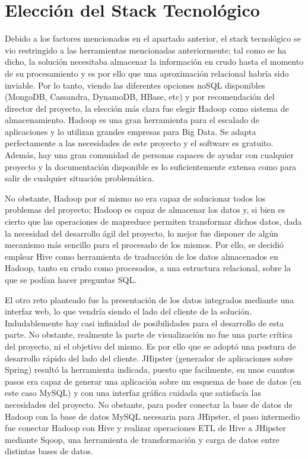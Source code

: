 \section{Elección del Stack Tecnológico}  \label{analisis.stack}
Debido a los factores mencionados en el apartado anterior, el stack tecnológico se vio restringido a las herramientas mencionadas anteriormente; tal como se ha dicho, la solución necesitaba almacenar la información en crudo hasta el momento de su procesamiento y es por ello que una aproximación relacional habría sido inviable. Por lo tanto, viendo las diferentes opciones noSQL disponibles (MongoDB, Cassandra, DynamoDB, HBase, etc) y por recomendación del director del proyecto, la elección más clara fue elegir Hadoop como sistema de almacenamiento. Hadoop es una gran herramienta para el escalado de aplicaciones y lo utilizan grandes empresas para Big Data. Se adapta perfectamente a las necesidades de este proyecto y el software es gratuito. Además, hay una gran comunidad de personas capaces de ayudar con cualquier proyecto y la documentación disponible es lo suficientemente extensa como para salir de cualquier situación problemática. \par
No obstante, Hadoop por sí mismo no era capaz de solucionar todos los problemas del proyecto; Hadoop es capaz de almacenar los datos y, si bien es cierto que las operaciones de mapreduce permiten transformar dichos datos, dada la necesidad del desarrollo ágil del proyecto, lo mejor fue disponer de algún mecanismo más sencillo para el procesado de los mismos. Por ello, se decidió emplear Hive como herramienta de traducción de los datos almacenados en Hadoop, tanto en crudo como procesados, a una estructura relacional, sobre la que se podían hacer preguntas SQL. \par
El otro reto planteado fue la presentación de los datos integrados mediante una interfaz web, lo que vendría siendo el lado del cliente de la solución. Indudablemente hay casi infinidad de posibilidades para el desarrollo de esta parte. No obstante, realmente la parte de visualización no fue una parte crítica del proyecto, ni el objetivo del mismo. Es por ello que se adoptó una postura de desarrollo rápido del lado del cliente. JHipster (generador de aplicaciones sobre Spring) resultó la herramienta indicada, puesto que facilmente, en unos cuantos pasos era capaz de generar una aplicación sobre un esquema de base de datos (en este caso MySQL) y con una interfaz gráfica cuidada que satisfacía las necesidades del proyecto. No obstante, para poder conectar la base de datos de Hadoop con la base de datos MySQL necesaria para JHipster, el paso intermedio fue conectar Hadoop con Hive y realizar operaciones ETL de Hive a JHipster mediante Sqoop, una herramienta de transformación y carga de datos entre distintas bases de datos.\par
